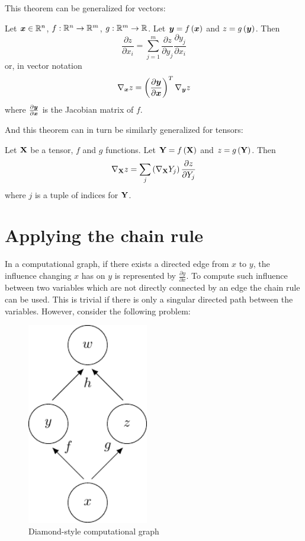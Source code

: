 This theorem can be generalized for vectors:

\begin{theorem}\label{chain_rule_vector}
	Let \( \bm{x} \in \mathbb{R}^n \), \( f : \mathbb{R}^n \to \mathbb{R}^m \), \( g : \mathbb{R}^m \to \mathbb{R} \). Let \( \bm{y} = f \left( \bm{x} \right) \) and \( z = g \left( \bm{y} \right) \). Then
	\[ \frac{\partial z}{\partial x_i} = \sum_{j = 1}^{m} \frac{\partial z}{\partial y_j} \frac{\partial y_j}{\partial x_i} \]
	or, in vector notation
	\[ \nabla_{\bm{x}} z = \left( \frac{\partial \bm{y}}{\partial \bm{x}} \right)^T \nabla_{\bm{y}} z \]
	where \( \frac{\partial \bm{y}}{\partial \bm{x}} \) is the Jacobian matrix of \( f \).
\end{theorem}

And this theorem can in turn be similarly generalized for tensors:

\begin{theorem}\label{chain_rule_tensor}
	Let \( \mathbf{X} \) be a tensor, \( f \) and \( g \) functions. Let \( \mathbf{Y} = f \left( \mathbf{X} \right) \) and \( z = g \left( \mathbf{Y} \right) \). Then
	\[ \nabla_{\mathbf{X}} z = \sum_j \left( \nabla_{\mathbf{X}} Y_j \right) \frac{\partial z}{\partial Y_j} \]
	where \( j \) is a tuple of indices for \( \mathbf{Y} \).
\end{theorem}

\section{Applying the chain rule}

In a computational graph, if there exists a directed edge from \( x \) to \( y \), the influence changing \( x \) has on \( y \) is represented by \( \frac{\partial y}{\partial x} \). To compute such influence between two variables which are not directly connected by an edge the chain rule can be used. This is trivial if there is only a singular directed path between the variables. However, consider the following problem:

\begin{figure}[h]
	\centering
	\includegraphics[width=150pt]{images/diamond/diamond.pdf}
	\caption{Diamond-style computational graph}\label{diamond}
\end{figure}

